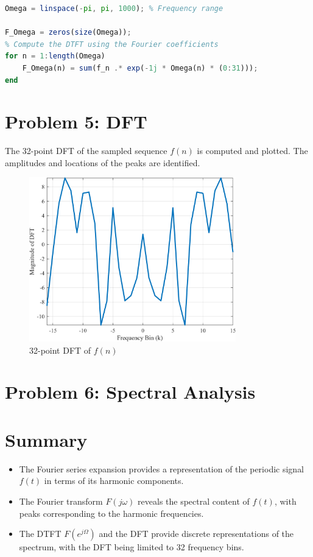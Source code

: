 \documentclass[12pt]{article}
\begin{document}
\begin{lstlisting}[language=Octave, caption=MATLAB Script to Compute DTFT]
Omega = linspace(-pi, pi, 1000); % Frequency range 

F_Omega = zeros(size(Omega));
% Compute the DTFT using the Fourier coefficients
for n = 1:length(Omega)
    F_Omega(n) = sum(f_n .* exp(-1j * Omega(n) * (0:31)));
end
\end{lstlisting}


\newpage
\section*{Problem 5: DFT}
The 32-point DFT of the sampled sequence $f(n)$ is computed and plotted. The amplitudes and locations of the peaks are identified.

\begin{figure}[H]
    \centering
    \includegraphics[width=0.8\textwidth]{F_k.png}
    \caption{32-point DFT of $f(n)$}
\end{figure}

\newpage
\section*{Problem 6: Spectral Analysis}


\newpage
\section*{Summary}
\begin{itemize}
    \item The Fourier series expansion provides a representation of the periodic signal $f(t)$ in terms of its harmonic components.
    \item The Fourier transform $F(j\omega)$ reveals the spectral content of $f(t)$, with peaks corresponding to the harmonic frequencies.
    \item The DTFT $F(e^{j\Omega})$ and the DFT provide discrete representations of the spectrum, with the DFT being limited to 32 frequency bins.
\end{itemize}
\end{document}
